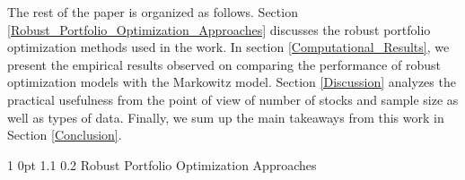 \documentclass[12pt]{article}
\makeatletter
\numberwithin{equation}{section}
\renewcommand{\section}{
  \@startsection
  {section}%
  {1}%
  {0pt}%
  {1.1\baselineskip}%
  {0.2\baselineskip}%
  {\sc \centering}%
}
\makeatother
\begin{document}
The rest of the paper is organized as follows. Section \ref{Robust_Portfolio_Optimization_Approaches} discusses the robust portfolio optimization methods used in the work. In section \ref{Computational_Results}, we present the empirical results observed on comparing the performance of robust optimization models with the Markowitz model. Section \ref{Discussion} analyzes the practical usefulness from the point of view of number of stocks and sample size as well as types of data. Finally, we sum up the main takeaways from this work in Section \ref{Conclusion}.

\section{Robust Portfolio Optimization Approaches}
\label{Robust_Portfolio_Optimization_Approaches}
\end{document}

